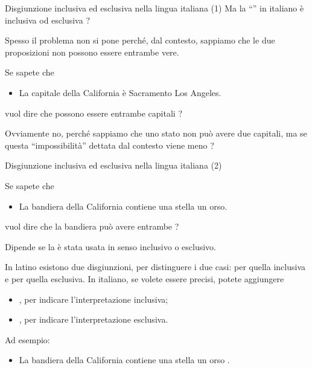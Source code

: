 \documentclass[10pt,dvipsnames,handout]{beamer}
\begin{document}
\begin{frame}{Disgiunzione inclusiva ed esclusiva nella lingua italiana (1)}
    Ma la ``'' in italiano è inclusiva od esclusiva ?

    \pause
    \medskip
    Spesso il problema non si pone perché, dal contesto, sappiamo che le due proposizioni non possono essere entrambe vere.
    \begin{example}
        Se sapete che
        \begin{itemize}
            \item La capitale della California è Sacramento  Los Angeles.
        \end{itemize}
        vuol dire che possono essere entrambe capitali ?
    \end{example}

    \pause
    Ovviamente no, perché sappiamo che uno stato non può avere due capitali, ma se questa  ``impossibilità'' dettata dal contesto viene meno ?

\end{frame}

\begin{frame}{Disgiunzione inclusiva ed esclusiva nella lingua italiana (2)}
    \begin{example}
        Se sapete che
        \begin{itemize}
            \item La bandiera della California contiene una stella  un orso.
        \end{itemize}
        vuol dire che la bandiera può avere entrambe ?
    \end{example}

    \pause
    \medskip
    Dipende se la  è stata usata in senso inclusivo o esclusivo.

    \smallskip
    In latino esistono due disgiunzioni, per distinguere i due casi:  per quella inclusiva e  per quella esclusiva. In italiano, se volete essere precisi, potete aggiungere
    \begin{itemize}
        \item {}, per indicare l'interpretazione inclusiva;
        \item  {}, per indicare l'interpretazione esclusiva.
    \end{itemize}
    Ad esempio:
    \begin{itemize}
        \item La bandiera della California contiene una stella  un orso .
    \end{itemize}
\end{frame}
\end{document}
